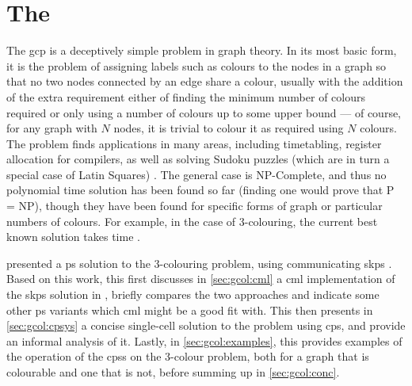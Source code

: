 \newcommand{\bo}{\(b\)}

\chapter{\label{chap:gcol}The }


The \gls{gcp} is a deceptively simple problem in graph theory.  In its most basic form, it is the problem of assigning labels such as colours to the nodes in a graph so that no two nodes connected by an edge share a colour, usually with the addition of the extra requirement either of finding the minimum number of colours required or only using a number of colours up to some upper bound --- of course, for any graph with \(N\) nodes, it is trivial to colour it as required using \(N\) colours.  The problem finds applications in many areas, including timetabling, register allocation for compilers, as well as solving Sudoku puzzles (which are in turn a special case of Latin Squares) \cite{Lewis2016}.  The general case is NP-Complete, and thus no polynomial time solution has been found so far (finding one would prove that P = NP), though they have been found for specific forms of graph or particular numbers of colours.  For example, in the case of 3-colouring, the current best known solution takes  time \cite{Beigel2005}.

\citeauthor{Gheorghe2013} presented a \gls{ps} solution to the 3-colouring problem, using communicating \gls{skps} \cite{Gheorghe2013}.  Based on this work, this  first discusses in \cref{sec:gcol:cml} a \gls{cml} implementation of the \gls{skps} solution in \cite{Gheorghe2013}, briefly compares the two approaches and indicate some other \gls{ps} variants which \gls{cml} might be a good fit with.  This  then presents in \cref{sec:gcol:cpsys} a concise single-cell solution to the problem using \gls{cps}, and provide an informal analysis of it.  Lastly, in \cref{sec:gcol:examples}, this  provides examples of the operation of the \glspl{cps} on the 3-colour problem, both for a graph that is colourable and one that is not, before summing up in \cref{sec:gcol:conc}.







